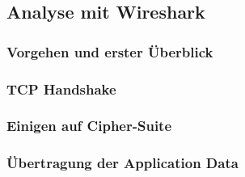 \subsection{Analyse mit Wireshark}
\subsubsection{Vorgehen und erster Überblick}
\subsubsection{TCP Handshake}
\subsubsection{Einigen auf Cipher-Suite}
\subsubsection{Übertragung der Application Data}
